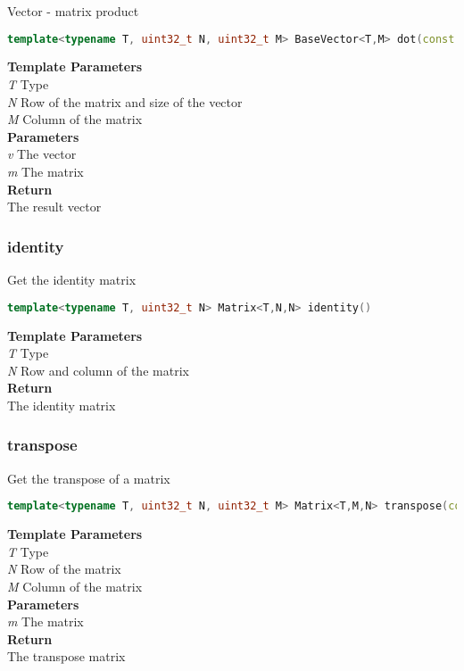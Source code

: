 \begin{mdframed}
Vector - matrix product
\begin{lstlisting}[language=C++]
template<typename T, uint32_t N, uint32_t M> BaseVector<T,M> dot(const BaseVector<T,N>& v, const Matrix<T,N,M>& m) 
\end{lstlisting}
\textbf{Template Parameters} \\ 
\textit{T} Type \\ 
\textit{N} Row of the matrix and size of the vector \\ 
\textit{M} Column of the matrix \\ 
\textbf{Parameters} \\ 
\textit{v} The vector \\ 
\textit{m} The matrix \\ 
\textbf{Return} \\ 
The result vector\\ 
\end{mdframed}

\subsubsection{identity}
\begin{mdframed}
Get the identity matrix
\begin{lstlisting}[language=C++]
template<typename T, uint32_t N> Matrix<T,N,N> identity() 
\end{lstlisting}
\textbf{Template Parameters} \\ 
\textit{T} Type \\ 
\textit{N} Row and column of the matrix \\ 
\textbf{Return} \\ 
The identity matrix\\ 
\end{mdframed}

\subsubsection{transpose}
\begin{mdframed}
Get the transpose of a matrix
\begin{lstlisting}[language=C++]
template<typename T, uint32_t N, uint32_t M> Matrix<T,M,N> transpose(const Matrix<T,N,M>& m) 
\end{lstlisting}
\textbf{Template Parameters} \\ 
\textit{T} Type \\ 
\textit{N} Row of the matrix \\ 
\textit{M} Column of the matrix \\ 
\textbf{Parameters} \\ 
\textit{m} The matrix \\ 
\textbf{Return} \\ 
The transpose matrix\\ 
\end{mdframed}


